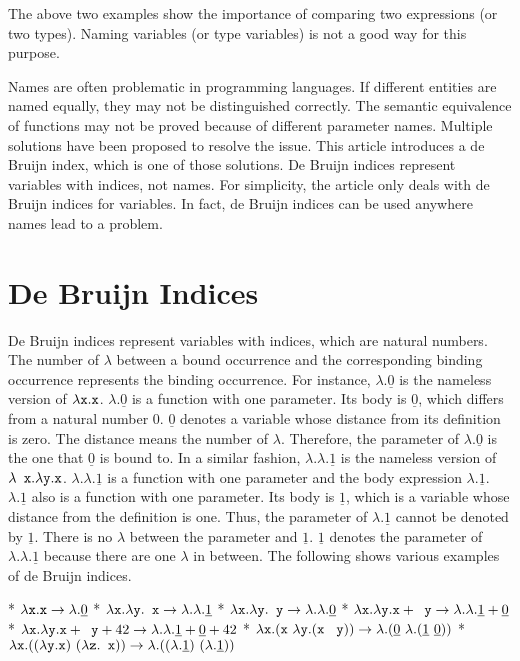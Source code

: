 The above two examples show the importance of comparing two expressions (or two
types). Naming variables (or type variables) is not a good way for this purpose.

Names are often problematic in programming languages. If different entities are
named equally, they may not be distinguished correctly. The semantic equivalence
of functions may not be proved because of different parameter names. Multiple
solutions have been proposed to resolve the issue. This article introduces a de
Bruijn index, which is one of those solutions. De Bruijn indices represent
variables with indices, not names. For simplicity, the article only deals with de
Bruijn indices for variables. In fact, de Bruijn indices can be used anywhere
names lead to a problem.

\section{De Bruijn Indices}

De Bruijn indices represent variables with indices, which are natural numbers.
The number of $\lambda$ between a bound occurrence and the corresponding binding
occurrence represents the binding occurrence. For instance,
$\lambda.\underline{0}$ is the nameless version of $\lambda \texttt{x}.\texttt{x}$.
$\lambda.\underline{0}$ is a function with one parameter. Its body is
$\underline{0}$, which differs from a natural number $0$. $\underline{0}$ denotes
a variable whose distance from its definition is zero. The distance means the
number of $\lambda$. Therefore, the parameter of $\lambda.\underline{0}$ is the
one that $\underline{0}$ is bound to. In a similar fashion,
$\lambda.\lambda.\underline{1}$ is the nameless version of $\lambda \texttt{
x}.\lambda\texttt{y}.\texttt{x}$. $\lambda.\lambda.\underline{1}$ is a function with
one parameter and the body expression $\lambda.\underline{1}$.
$\lambda.\underline{1}$ also is a function with one parameter. Its body is
$\underline{1}$, which is a variable whose distance from the definition is one.
Thus, the parameter of $\lambda.\underline{1}$ cannot be denoted by
$\underline{1}$. There is no $\lambda$ between the parameter and $\underline{1}$.
$\underline{1}$ denotes the parameter of $\lambda.\lambda.\underline{1}$ because
there are one $\lambda$ in between. The following shows various examples of de
Bruijn indices.

* $\lambda \texttt{x}.\texttt{x}\rightarrow\lambda.\underline{0}$
* $\lambda \texttt{x}.\lambda \texttt{y}.\texttt{
x}\rightarrow\lambda.\lambda.\underline{1}$
* $\lambda \texttt{x}.\lambda \texttt{y}.\texttt{
y}\rightarrow\lambda.\lambda.\underline{0}$
* $\lambda \texttt{x}.\lambda \texttt{y}.\texttt{x}+\texttt{
y}\rightarrow\lambda.\lambda.\underline{1}+\underline{0}$
* $\lambda \texttt{x}.\lambda \texttt{y}.\texttt{x}+\texttt{
y}+42\rightarrow\lambda.\lambda.\underline{1}+\underline{0}+42$
* $\lambda \code{x}.(\code{x}\ \lambda \code{y}.(\code{x}\ \code{
y}))\rightarrow\lambda.(\underline{0}\ \lambda.(\underline{1}\ \underline{0}))$
* $\lambda \code{x}.((\lambda \code{y}.\code{x})\ (\lambda \code{z}.\code{
x}))\rightarrow\lambda.((\lambda.\underline{1})\ (\lambda.\underline{1}))$

